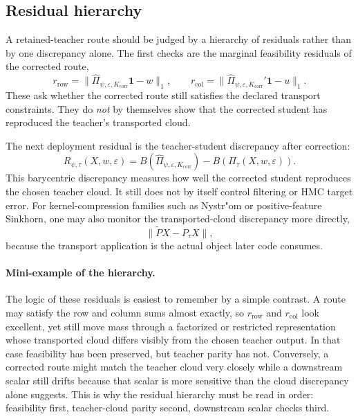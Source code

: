 \subsection{Residual hierarchy}
\label{sec:bf-learned-ot-residuals}

A retained-teacher route should be judged by a hierarchy of residuals rather than
by one discrepancy alone.  The first checks are the marginal feasibility residuals
of the corrected route,
\begin{equation}
\label{eq:bf-learned-ot-row-col-residuals}
  r_{\mathrm{row}}
  =
  \|\widehat\Pi_{\psi,\varepsilon,K_{\mathrm{corr}}}\mathbf 1-w\|_1,
  \qquad
  r_{\mathrm{col}}
  =
  \|\widehat\Pi_{\psi,\varepsilon,K_{\mathrm{corr}}}'\mathbf 1-u\|_1.
\end{equation}
These ask whether the corrected route still satisfies the declared transport
constraints.  They do \emph{not} by themselves show that the corrected student has
reproduced the teacher's transported cloud.

The next deployment residual is the teacher-student discrepancy after correction:
\begin{equation}
\label{eq:bf-learned-ot-residual}
  R_{\psi,\tau}(X,w,\varepsilon)
  =
  B(\widehat\Pi_{\psi,\varepsilon,K_{\mathrm{corr}}})
  -
  B(\Pi_\tau(X,w,\varepsilon)).
\end{equation}
This barycentric discrepancy measures how well the corrected student reproduces the
chosen teacher cloud.  It still does not by itself control filtering or HMC target
error.  For kernel-compression families such as Nystr"om or positive-feature
Sinkhorn, one may also monitor the transported-cloud discrepancy more directly,
\begin{equation}
\label{eq:bf-learned-ot-transport-discrepancy}
  \|\widetilde P X - P_\tau X\|,
\end{equation}
because the transport application is the actual object later code consumes.

\paragraph{Mini-example of the hierarchy.}
The logic of these residuals is easiest to remember by a simple contrast.  A route
may satisfy the row and column sums almost exactly, so \(r_{\mathrm{row}}\) and
\(r_{\mathrm{col}}\) look excellent, yet still move mass through a factorized or
restricted representation whose transported cloud differs visibly from the chosen
teacher output.  In that case feasibility has been preserved, but teacher parity
has not.  Conversely, a corrected route might match the teacher cloud very closely
while a downstream scalar still drifts because that scalar is more sensitive than the
cloud discrepancy alone suggests.  This is why the residual hierarchy must be read
in order: feasibility first, teacher-cloud parity second, downstream scalar checks
third.

